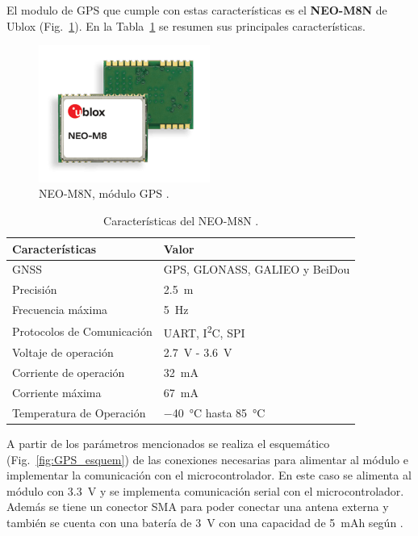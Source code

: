 El modulo de GPS que cumple con estas características es el \textbf{NEO-M8N} de Ublox (Fig.~\ref{fig:GPS}). En la Tabla~\ref{diag:GPS} se resumen sus principales características.
\begin{figure}[hbtp!]
\centering
\includegraphics[width=0.5\textwidth]{NEO-M8.png}
\caption[NEO-M8N, módulo GPS]{NEO-M8N, módulo GPS \cite{GPS}.}
\label{fig:GPS}
\end{figure}

\bgroup
\def\arraystretch{1.5}%
\begin{table}[htbp!]
\centering
\caption[Características del NEO-M8N]{Características del NEO-M8N \cite{GPS}.}
\begin{tabular}{@{}ll@{}}
\toprule
Características & Valor \\ \midrule
GNSS & GPS, GLONASS, GALIEO y BeiDou \\
Precisión & \SI{2.5}{m} \\
Frecuencia máxima & \SI{5}{Hz} \\
Protocolos de Comunicación & UART, I\textsuperscript{2}C, SPI \\
Voltaje de operación & \SI{2.7}{V} - \SI{3.6}{V} \\
Corriente de operación & \SI{32}{mA} \\
Corriente máxima & \SI{67}{mA} \\
Temperatura de Operación & \SI{-40}{\celsius} hasta \SI{85}{\celsius} \\\bottomrule
\end{tabular}
\label{diag:GPS}
\end{table}
\egroup

A partir de los parámetros mencionados se realiza el esquemático (Fig.~\ref{fig:GPS_esquem}) de las conexiones necesarias para alimentar al módulo e implementar la comunicación con el microcontrolador. En este caso se alimenta al módulo con \SI{3.3}{V} y se implementa comunicación serial con el microcontrolador. Además se tiene un conector SMA para poder conectar una antena externa y también se cuenta con una batería de \SI{3}{V} con una capacidad de \SI{5}{mAh} según \cite{MS621FE}.


